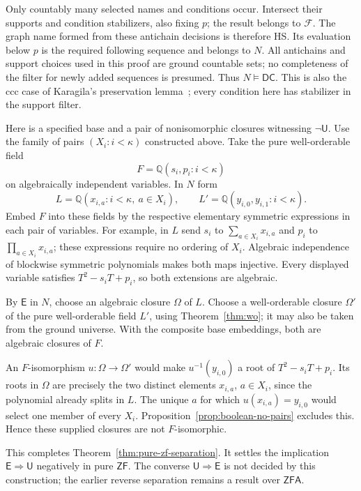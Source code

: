 \documentclass[11pt,a4paper]{article}
\theoremstyle{definition}\newtheorem{definition}[theorem]{Definition}
\theoremstyle{remark}\newtheorem{remark}[theorem]{Remark}
\newcommand{\ZF}{\mathsf{ZF}}\newcommand{\ZFA}{\mathsf{ZFA}}
\newcommand{\E}{\mathsf E}\newcommand{\U}{\mathsf U}
\newcommand{\Q}{\mathbb Q}\newcommand{\F}{\mathbb F}
\begin{document}
Only countably many selected names and conditions occur. Intersect their supports and condition stabilizers, also fixing $p$; the result belongs to $\mathcal F$. The graph name formed from these antichain decisions is therefore HS. Its evaluation below $p$ is the required following sequence and belongs to $N$. All antichains and support choices used in this proof are ground countable sets; no completeness of the filter for newly added sequences is presumed. Thus $N\models\mathsf{DC}$. This is also the ccc case of Karagila's preservation lemma~\cite[Lemma~3.3]{KaragilaDC}; every condition here has stabilizer in the support filter.

Here is a specified base and a pair of nonisomorphic closures witnessing $\neg\U$. Use the family of pairs $(X_i:i<\kappa)$ constructed above. Take the pure well-orderable field
\[
F=\Q(s_i,p_i:i<\kappa)
\]
on algebraically independent variables. In $N$ form
\[
L=\Q(x_{i,a}:i<\kappa,\ a\in X_i),\qquad
L'=\Q(y_{i,0},y_{i,1}:i<\kappa).
\]
Embed $F$ into these fields by the respective elementary symmetric expressions in each pair of variables. For example, in $L$ send $s_i$ to $\sum_{a\in X_i}x_{i,a}$ and $p_i$ to $\prod_{a\in X_i}x_{i,a}$; these expressions require no ordering of $X_i$. Algebraic independence of blockwise symmetric polynomials makes both maps injective. Every displayed variable satisfies $T^2-s_iT+p_i$, so both extensions are algebraic.

By $\E$ in $N$, choose an algebraic closure $\Omega$ of $L$. Choose a well-orderable closure $\Omega'$ of the pure well-orderable field $L'$, using Theorem~\ref{thm:wo}; it may also be taken from the ground universe. With the composite base embeddings, both are algebraic closures of $F$.

An $F$-isomorphism $u:\Omega\to\Omega'$ would make $u^{-1}(y_{i,0})$ a root of $T^2-s_iT+p_i$. Its roots in $\Omega$ are precisely the two distinct elements $x_{i,a}$, $a\in X_i$, since the polynomial already splits in $L$. The unique $a$ for which $u(x_{i,a})=y_{i,0}$ would select one member of every $X_i$. Proposition~\ref{prop:boolean-no-pairs} excludes this. Hence these supplied closures are not $F$-isomorphic.

This completes Theorem~\ref{thm:pure-zf-separation}. It settles the implication $\E\Rightarrow\U$ negatively in pure $\ZF$. The converse $\U\Rightarrow\E$ is not decided by this construction; the earlier reverse separation remains a result over $\ZFA$.
\end{document}

